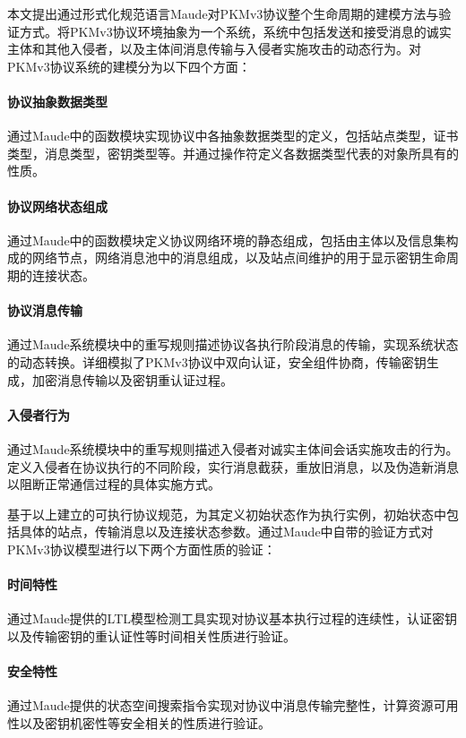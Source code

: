 本文提出通过形式化规范语言Maude对PKMv3协议整个生命周期的建模方法与验证方式。将PKMv3协议环境抽象为一个系统，系统中包括发送和接受消息的诚实主体和其他入侵者，以及主体间消息传输与入侵者实施攻击的动态行为。对PKMv3协议系统的建模分为以下四个方面：

\paragraph{协议抽象数据类型}
通过Maude中的函数模块实现协议中各抽象数据类型的定义，包括站点类型，证书类型，消息类型，密钥类型等。并通过操作符定义各数据类型代表的对象所具有的性质。

\paragraph{协议网络状态组成}
通过Maude中的函数模块定义协议网络环境的静态组成，包括由主体以及信息集构成的网络节点，网络消息池中的消息组成，以及站点间维护的用于显示密钥生命周期的连接状态。

\paragraph{协议消息传输}
通过Maude系统模块中的重写规则描述协议各执行阶段消息的传输，实现系统状态的动态转换。详细模拟了PKMv3协议中双向认证，安全组件协商，传输密钥生成，加密消息传输以及密钥重认证过程。

\paragraph{入侵者行为}
通过Maude系统模块中的重写规则描述入侵者对诚实主体间会话实施攻击的行为。定义入侵者在协议执行的不同阶段，实行消息截获，重放旧消息，以及伪造新消息以阻断正常通信过程的具体实施方式。

     基于以上建立的可执行协议规范，为其定义初始状态作为执行实例，初始状态中包括具体的站点，传输消息以及连接状态参数。通过Maude中自带的验证方式对PKMv3协议模型进行以下两个方面性质的验证：

\paragraph{时间特性}
 通过Maude提供的LTL模型检测工具实现对协议基本执行过程的连续性，认证密钥以及传输密钥的重认证性等时间相关性质进行验证。

\paragraph{安全特性} 通过Maude提供的状态空间搜索指令实现对协议中消息传输完整性，计算资源可用性以及密钥机密性等安全相关的性质进行验证。


